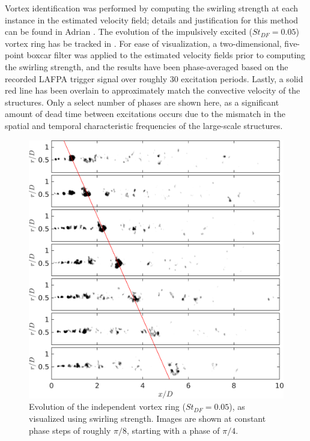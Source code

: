 Vortex identification was performed by computing the swirling strength at each instance in the estimated velocity field; details and justification for this method can be found in Adrian \etal \citep{Adrian2000}.
The evolution of the impulsively excited ($St_{DF} = 0.05$) vortex ring has be tracked in .
For ease of visualization, a two-dimensional, five-point boxcar filter was applied to the estimated velocity fields prior to computing the swirling strength, and the results have been phase-averaged based on the recorded LAFPA trigger signal over roughly 30 excitation periods.
Lastly, a solid red line has been overlain to approximately match the convective velocity of the structures.
Only a select number of phases are shown here, as a significant amount of dead time between excitations occurs due to the mismatch in the spatial and temporal characteristic frequencies of the large-scale structures.
\begin{figure}
	\centering
	\includegraphics[width=5in]{Figures/ch4_St005_lambda.png}
	\caption{Evolution of the independent vortex ring ($St_{DF}=0.05$), as visualized using swirling strength. Images are shown at constant phase steps of roughly $\pi/8$, starting with a phase of $\pi/4$.}
	\label{fig:ch4_impulse_structure_disintegration}
\end{figure}

